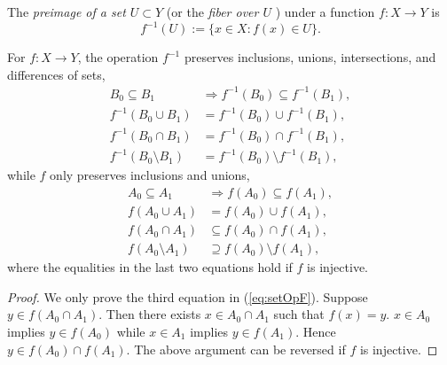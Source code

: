 \begin{defn}
  \label{def:preimage}
  The \emph{preimage of a set $U\subset Y$}
  (or the \emph{fiber over $U$ })
  under a function $f: X\rightarrow Y$ is 
   \begin{equation}
     \label{eq:preimage}
     f^{-1}(U) := \{ x\in X: f(x)\in U\}.
   \end{equation}
\end{defn}

\begin{lem}
  \label{lem:setOpPreservation}
  For $f: X\rightarrow Y$, the operation $f^{-1}$ preserves inclusions,
  unions, intersections, and differences of sets, 
  \begin{subequations}
    \label{eq:setOpFpre}
    \begin{align}
      B_0\subseteq B_1 &\Rightarrow f^{-1}(B_0)\subseteq f^{-1}(B_1),
      \\
      f^{-1}(B_0\cup B_1) &= f^{-1}(B_0) \cup f^{-1}(B_1),
      \\
      f^{-1}(B_0\cap B_1) &= f^{-1}(B_0) \cap f^{-1}(B_1),
      \\
      f^{-1}(B_0\setminus B_1) &= f^{-1}(B_0) \setminus f^{-1}(B_1), 
    \end{align}
  \end{subequations}
  while $f$ only preserves inclusions and unions, 
  \begin{subequations}
    \label{eq:setOpF}
    \begin{align}
      A_0\subseteq A_1 &\Rightarrow f(A_0)\subseteq f(A_1),
      \\
      f(A_0\cup A_1) &= f(A_0) \cup f(A_1),
      \\
      f(A_0\cap A_1) &\subseteq f(A_0) \cap f(A_1),
      \\
      f(A_0\setminus A_1) &\supseteq f(A_0) \setminus f(A_1),
    \end{align}
  \end{subequations}
  where the equalities in the last two equations hold
  if $f$ is injective.
\end{lem}
\begin{proof}
  We only prove the third equation in (\ref{eq:setOpF}).
  Suppose $y\in f(A_0\cap A_1)$.
  Then there exists $x\in A_0\cap A_1$ such that $f(x)=y$.
   $x\in A_0$ implies $y\in f(A_0)$
   while $x\in A_1$ implies $y\in f(A_1)$.
  Hence $y\in f(A_0)\cap f(A_1)$.
  The above argument can be reversed if $f$ is injective.
\end{proof}

